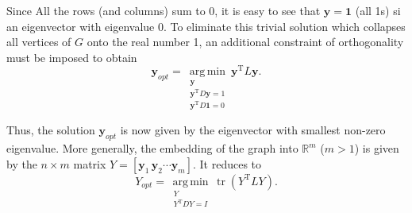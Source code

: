 Since All the rows (and columns) sum to 0, it is easy to see that $\mathbf{y}=\mathbf{1}$ (all 1s) si an eigenvector with eigenvalue 0. To eliminate this trivial solution which collapses all vertices of $G$ onto the real number 1, an additional constraint of orthogonality must be imposed to obtain
\begin{equation}
	\mathbf{y}_{opt}=\operatorname*{arg\,min}\limits_{\substack{\mathbf{y}\\\mathbf{y}^{\operatorname{T}}D\mathbf{y}=1\\\mathbf{y}^{\operatorname{T}}D\mathbf{1}=0}} \mathbf{y}^{\operatorname{T}}L\mathbf{y}.
\end{equation}

Thus, the solution $\mathbf{y}_{opt}$ is now given by the eigenvector with smallest non-zero eigenvalue. More generally, the embedding of the graph into $\mathbb{R}^m $ ($m>1$) is given by the $n\times m$ matrix $Y=\left[\mathbf{y}_1\,\mathbf{y}_2\cdots \mathbf{y}_m\right]$. It reduces to
\begin{equation}
	Y_{opt}=\operatorname*{arg\,min}\limits_{\substack{Y\\Y^{\operatorname{T}}DY=I}} \operatorname{tr}{\left(Y^{\operatorname{T}}LY\right)}.
\end{equation} 
